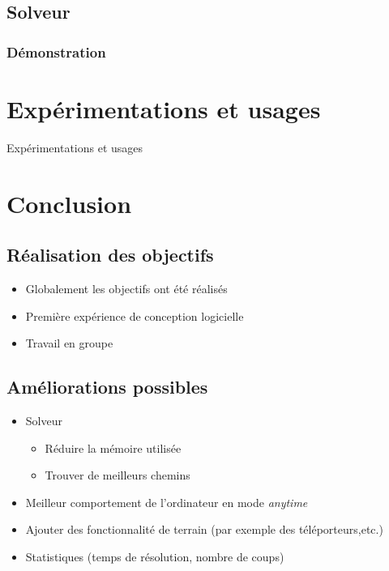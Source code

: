 \documentclass{beamer}
\begin{document}
\subsection{Solveur}
\begin{frame}
\frametitle{Démonstration}
\end{frame}


\section{Expérimentations et usages}
\begin{frame}
Expérimentations et usages
\end{frame}

\section{Conclusion}
\subsection{Réalisation des objectifs}
\begin{frame}
\begin{itemize}
\item Globalement les objectifs ont été réalisés
\item Première expérience de conception logicielle
\item Travail en groupe 
\end{itemize}
\end{frame}

\subsection{Améliorations possibles}
\begin{frame}
\begin{itemize}
\item Solveur
\begin{itemize}
\item Réduire la mémoire utilisée
\item Trouver de meilleurs chemins
\end{itemize}
\item Meilleur comportement de l'ordinateur en mode \textit{anytime}
\item Ajouter des fonctionnalité de terrain (par exemple des téléporteurs,etc.)
\item Statistiques (temps de résolution, nombre de coups)
\end{itemize}
\end{frame}
\end{document}
